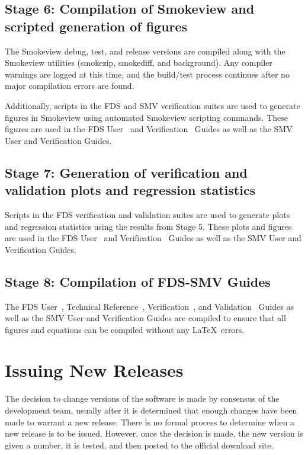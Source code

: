 \documentclass[11pt]{book}
\begin{document}
\subsection*{Stage 6: Compilation of Smokeview and scripted generation of figures}

The Smokeview debug, test, and release versions are compiled along with the Smokeview utilities (smokezip, smokediff, and background). Any compiler warnings are logged at this time, and the build/test process continues after no major compilation errors are found.

Additionally, scripts in the FDS and SMV verification suites are used to generate figures in Smokeview using automated Smokeview scripting commands. These figures are used in the FDS User~\cite{FDS_Users_Guide} and Verification~\cite{FDS_Verification_Guide} Guides as well as the SMV User and Verification Guides.

\subsection*{Stage 7: Generation of verification and validation plots and regression statistics}

Scripts in the FDS verification and validation suites are used to generate plots and regression statistics using the results from Stage 5. These plots and figures are used in the FDS User~\cite{FDS_Users_Guide} and Verification~\cite{FDS_Verification_Guide} Guides as well as the SMV User and Verification Guides.

\subsection*{Stage 8: Compilation of FDS-SMV Guides}

The FDS User~\cite{FDS_Users_Guide}, Technical Reference~\cite{FDS_Math_Guide}, Verification~\cite{FDS_Verification_Guide}, and Validation~\cite{FDS_Validation_Guide} Guides as well as the SMV User and Verification Guides are compiled to ensure that all figures and equations can be compiled without any \LaTeX\ errors.

\clearpage
\section{Issuing New Releases}

The decision to change versions of the software is made by consensus of the development team, usually after it is determined that enough
changes have been made to warrant a new release. There is no formal process to determine when a new release is to be issued. However, once the
decision is made, the new version is given a number, it is tested, and then posted to the official download site.
\end{document}

